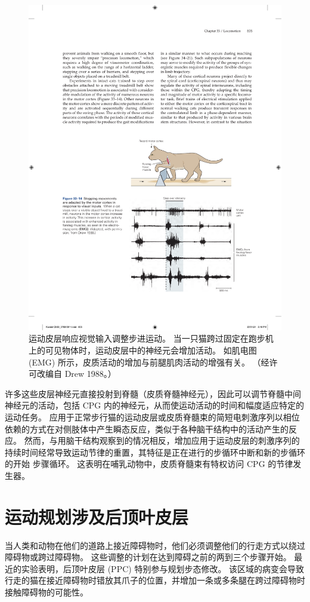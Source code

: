 \begin{figure}[htbp]
	\centering
	\includegraphics[width=0.75\linewidth]{chap33/fig_33_14}
	\caption{运动皮层响应视觉输入调整步进运动。 当一只猫跨过固定在跑步机上的可见物体时，运动皮层中的神经元会增加活动。 如肌电图 (EMG) 所示，皮质活动的增加与前腿肌肉活动的增强有关。 （经许可改编自 Drew 1988。）}
	\label{fig:33_14}
\end{figure}

许多这些皮层神经元直接投射到脊髓（皮质脊髓神经元），因此可以调节脊髓中间神经元的活动，包括 CPG 内的神经元，从而使运动活动的时间和幅度适应特定的运动任务。 应用于正常步行猫的运动皮层或皮质脊髓束的简短电刺激序列以相位依赖的方式在对侧肢体中产生瞬态反应，类似于各种脑干结构中的活动产生的反应。 然而，与用脑干结构观察到的情况相反，增加应用于运动皮层的刺激序列的持续时间经常导致运动节律的重置，其特征是正在进行的步循环中断和新的步循环的开始 步骤循环。 这表明在哺乳动物中，皮质脊髓束有特权访问 CPG 的节律发生器。

\section{运动规划涉及后顶叶皮层}
当人类和动物在他们的道路上接近障碍物时，他们必须调整他们的行走方式以绕过障碍物或跨过障碍物。 这些调整的计划在达到障碍之前的两到三个步骤开始。 最近的实验表明，后顶叶皮层 (PPC) 特别参与规划步态修改。 该区域的病变会导致行走的猫在接近障碍物时错放其爪子的位置，并增加一条或多条腿在跨过障碍物时接触障碍物的可能性。

